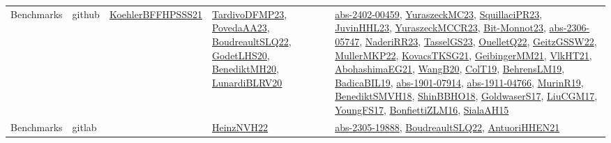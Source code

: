 {\begin{longtable}{lp{3cm}>{\raggedright}p{6cm}>{\raggedright}p{6cm}p{8cm}}
Benchmarks & github & \href{articles/KoehlerBFFHPSSS21.pdf}{KoehlerBFFHPSSS21}\cite{KoehlerBFFHPSSS21} & \href{papers/TardivoDFMP23.pdf}{TardivoDFMP23}\cite{TardivoDFMP23}, \href{papers/PovedaAA23.pdf}{PovedaAA23}\cite{PovedaAA23}, \href{papers/BoudreaultSLQ22.pdf}{BoudreaultSLQ22}\cite{BoudreaultSLQ22}, \href{papers/GodetLHS20.pdf}{GodetLHS20}\cite{GodetLHS20}, \href{articles/BenediktMH20.pdf}{BenediktMH20}\cite{BenediktMH20}, \href{articles/LunardiBLRV20.pdf}{LunardiBLRV20}\cite{LunardiBLRV20} & \href{articles/abs-2402-00459.pdf}{abs-2402-00459}\cite{abs-2402-00459}, \href{papers/YuraszeckMC23.pdf}{YuraszeckMC23}\cite{YuraszeckMC23}, \href{papers/SquillaciPR23.pdf}{SquillaciPR23}\cite{SquillaciPR23}, \href{papers/JuvinHHL23.pdf}{JuvinHHL23}\cite{JuvinHHL23}, \href{articles/YuraszeckMCCR23.pdf}{YuraszeckMCCR23}\cite{YuraszeckMCCR23}, \href{papers/Bit-Monnot23.pdf}{Bit-Monnot23}\cite{Bit-Monnot23}, \href{articles/abs-2306-05747.pdf}{abs-2306-05747}\cite{abs-2306-05747}, \href{articles/NaderiRR23.pdf}{NaderiRR23}\cite{NaderiRR23}, \href{papers/TasselGS23.pdf}{TasselGS23}\cite{TasselGS23}, \href{papers/OuelletQ22.pdf}{OuelletQ22}\cite{OuelletQ22}, \href{papers/GeitzGSSW22.pdf}{GeitzGSSW22}\cite{GeitzGSSW22}, \href{articles/MullerMKP22.pdf}{MullerMKP22}\cite{MullerMKP22}, \href{papers/KovacsTKSG21.pdf}{KovacsTKSG21}\cite{KovacsTKSG21}, \href{papers/GeibingerMM21.pdf}{GeibingerMM21}\cite{GeibingerMM21}, \href{articles/VlkHT21.pdf}{VlkHT21}\cite{VlkHT21}, \href{articles/AbohashimaEG21.pdf}{AbohashimaEG21}\cite{AbohashimaEG21}, \href{papers/WangB20.pdf}{WangB20}\cite{WangB20}, \href{papers/ColT19.pdf}{ColT19}\cite{ColT19}, \href{papers/BehrensLM19.pdf}{BehrensLM19}\cite{BehrensLM19}, \href{papers/BadicaBIL19.pdf}{BadicaBIL19}\cite{BadicaBIL19}, \href{articles/abs-1901-07914.pdf}{abs-1901-07914}\cite{abs-1901-07914}, \href{articles/abs-1911-04766.pdf}{abs-1911-04766}\cite{abs-1911-04766}, \href{papers/MurinR19.pdf}{MurinR19}\cite{MurinR19}, \href{papers/BenediktSMVH18.pdf}{BenediktSMVH18}\cite{BenediktSMVH18}, \href{articles/ShinBBHO18.pdf}{ShinBBHO18}\cite{ShinBBHO18}, \href{papers/GoldwaserS17.pdf}{GoldwaserS17}\cite{GoldwaserS17}, \href{papers/LiuCGM17.pdf}{LiuCGM17}\cite{LiuCGM17}, \href{papers/YoungFS17.pdf}{YoungFS17}\cite{YoungFS17}, \href{papers/BonfiettiZLM16.pdf}{BonfiettiZLM16}\cite{BonfiettiZLM16}, \href{papers/SialaAH15.pdf}{SialaAH15}\cite{SialaAH15}\\
Benchmarks & gitlab &  & \href{articles/HeinzNVH22.pdf}{HeinzNVH22}\cite{HeinzNVH22} & \href{articles/abs-2305-19888.pdf}{abs-2305-19888}\cite{abs-2305-19888}, \href{papers/BoudreaultSLQ22.pdf}{BoudreaultSLQ22}\cite{BoudreaultSLQ22}, \href{papers/AntuoriHHEN21.pdf}{AntuoriHHEN21}\cite{AntuoriHHEN21}\\

\end{longtable}}
